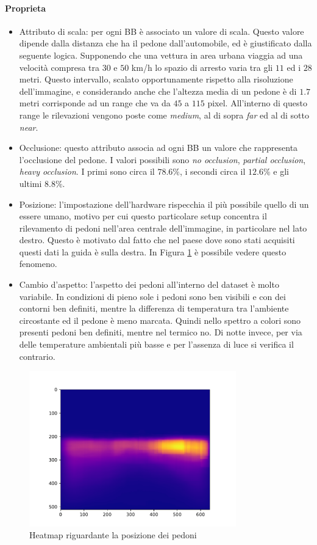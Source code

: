 \paragraph{Proprieta}
\begin{itemize}
    \item Attributo di scala: per ogni \ac{BB} è associato un valore di scala. Questo valore dipende dalla distanza che ha il pedone dall'automobile, ed è giustificato dalla seguente logica. Supponendo che una vettura in area urbana viaggia ad una velocità compresa tra $30$ e $50$ km/h lo spazio di arresto varia tra gli $11$ ed i $28$ metri. Questo intervallo, scalato opportunamente rispetto alla risoluzione dell'immagine, e considerando anche che l'altezza media di un pedone è di $1.7$ metri corrisponde ad un range che va da $45$ a $115$ pixel. All'interno di questo range le rilevazioni vengono poste come \textit{medium}, al di sopra \textit{far} ed al di sotto \textit{near}.
    \item Occlusione: questo attributo associa ad ogni \ac{BB} un valore che rappresenta l'occlusione del pedone. I valori possibili sono \textit{no occlusion}, \textit{partial occlusion}, \textit{heavy occlusion}. I primi sono circa il $78.6\%$, i secondi circa il $12.6\%$ e gli ultimi $8.8\%$.
    \item Posizione: l'impostazione dell'hardware rispecchia il più possibile quello di un essere umano, motivo per cui questo particolare setup concentra il rilevamento di pedoni nell'area centrale dell'immagine, in particolare nel lato destro. Questo è motivato dal fatto che nel paese dove sono stati acquisiti questi dati la guida è sulla destra. In Figura \ref{fig:heatmap} è possibile vedere questo fenomeno.
    \item Cambio d'aspetto: l'aspetto dei pedoni all'interno del dataset è molto variabile. In condizioni di pieno sole i pedoni sono ben visibili e con dei contorni ben definiti, mentre la differenza di temperatura tra l'ambiente circostante ed il pedone è meno marcata. Quindi nello spettro a colori sono presenti pedoni ben definiti, mentre nel termico no. Di notte invece, per via delle temperature ambientali più basse e per l'assenza di luce si verifica il contrario.
\end{itemize}
\begin{figure}
    \centering
    \includegraphics[width=0.8\textwidth]{images/graphic/heatmap.pdf}
    \caption{Heatmap riguardante la posizione dei pedoni}
    \label{fig:heatmap}
\end{figure}
